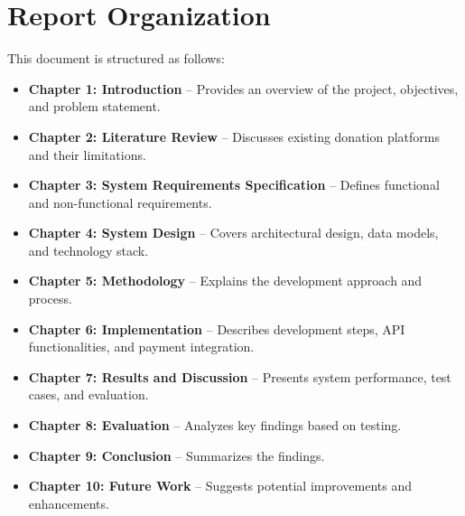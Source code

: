 \section{Report Organization}
This document is structured as follows:
\begin{itemize}
    \item \textbf{Chapter 1: Introduction} – Provides an overview of the project, objectives, and problem statement.
    \item \textbf{Chapter 2: Literature Review} – Discusses existing donation platforms and their limitations.
    \item \textbf{Chapter 3: System Requirements Specification} – Defines functional and non-functional requirements.
    \item \textbf{Chapter 4: System Design} – Covers architectural design, data models, and technology stack.
    \item \textbf{Chapter 5: Methodology} – Explains the development approach and process.
    \item \textbf{Chapter 6: Implementation} – Describes development steps, API functionalities, and payment integration.
    \item \textbf{Chapter 7: Results and Discussion} – Presents system performance, test cases, and evaluation.
    \item \textbf{Chapter 8: Evaluation} – Analyzes key findings based on testing.
    \item \textbf{Chapter 9: Conclusion} – Summarizes the findings.
    \item \textbf{Chapter 10: Future Work} – Suggests potential improvements and enhancements.
\end{itemize}
